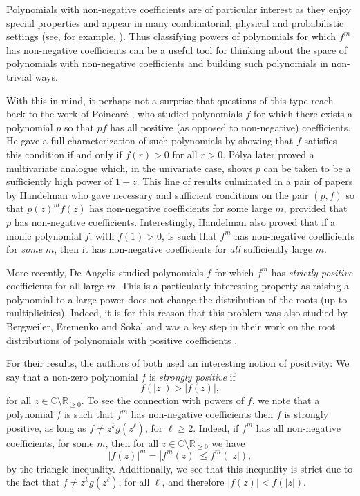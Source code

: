 \documentclass{daj}
\def\C{\mathbb{C}}
\newcommand{\R}{\mathbb{R}}
\theoremstyle{definition}
\theoremstyle{remark}
\begin{document}
Polynomials with non-negative coefficients are of particular interest as they enjoy special properties and appear in many combinatorial, physical and probabilistic settings (see, for example, \cite{scott-sokal,BBL,pemantle-survey,LPRS,yang-lee,lee-yang,clt1,clt2}). Thus classifying powers of polynomials for which $f^m$ has non-negative coefficients can be a useful tool for thinking about the space of polynomials with non-negative coefficients and building such polynomials in non-trivial ways.

With this in mind, it perhaps not a surprise that questions of this type reach back to the work of Poincar\'e \cite{poincare}, who studied polynomials $f$ for which there exists a polynomial $p$ so that $pf$ 
has all positive (as opposed to non-negative) coefficients. He gave a full characterization of such polynomials by showing that $f$ satisfies this condition if and only if $f(r) > 0$ for all $r > 0$.  P\'olya \cite{polya1928positive} later proved a multivariate analogue which, in the univariate case, shows $p$ can be taken to be a sufficiently high power of $1 + z$.  This line of results culminated in a pair of papers by Handelman \cite{handelman-85,handelman} who gave necessary and sufficient conditions on the pair $(p,f)$ so that $p(z)^m f(z)$ has non-negative coefficients for some large $m$, provided that $p$ has non-negative coefficients. 
Interestingly, Handelman \cite{handelman1992polynomials} also proved that if a monic polynomial $f$, with $f(1) >0$, is such that $f^m$ has non-negative coefficients for \emph{some} $m$, then it has non-negative coefficients for \emph{all} sufficiently large $m$.

More recently, De Angelis \cite{deAngelis-positivity} studied polynomials $f$ for which $f^m$ has \emph{strictly positive} coefficients for all large $m$. 
This is a particularly interesting property as raising a polynomial to a large power does not change the distribution of the roots (up to multiplicities). Indeed, it is for this reason that this problem was also studied by Bergweiler, Eremenko and Sokal \cite{bes} and was a key step in their work on the root distributions of polynomials with positive coefficients \cite{bergweiler-eremenko}.

For their results, the authors of both \cite{deAngelis-positivity,bergweiler-eremenko} used an interesting notion of positivity: We say that a non-zero polynomial $f$ is \emph{strongly positive} if 
\begin{equation}\label{eq:strong-positive}  f(|z|) > |f(z)|,\end{equation} for all $z \in \C \setminus \R_{\geq 0}$. To see the connection with powers of $f$, we note that a polynomial $f$ is such that $f^m$ has non-negative coefficients then $f$ is strongly positive, as long as $f \not= z^kg(z^{\ell})$, for $\ell \geq 2$. Indeed, if $f^m$ has all non-negative coefficients, for some $m$, then for all $z \in \C \setminus \R_{\geq 0}$ we have
\[ |f(z)|^m = |f^m(z)| \leq f^m(|z|),\]
by the triangle inequality. Additionally, we see that this inequality is strict due to the fact that $f \not= z^kg(z^{\ell})$, for all $\ell$, and therefore $|f(z)| < f(|z|)$.
\end{document}
